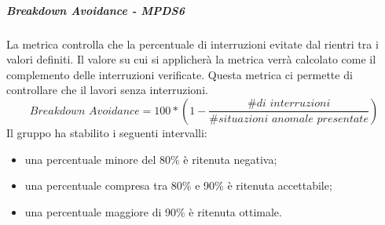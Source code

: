 \documentclass[PianoDiQualifica.tex]{subfiles}
\begin{document}
				\hypertarget{breakdown}{\subparagraph{Breakdown Avoidance - MPDS6}}
				La metrica controlla che la percentuale di interruzioni evitate dal  rientri tra i valori definiti. Il valore su cui si applicherà la metrica verrà calcolato come il
				complemento delle interruzioni verificate. Questa metrica ci permette di controllare che il  lavori senza interruzioni.
				\begin{equation}\textit{Breakdown Avoidance} = 100 * \left ( 1 - \frac{\textit{\# di interruzioni}}{\textit{\# situazioni anomale presentate}} \right ) \end{equation}
				Il gruppo ha stabilito i seguenti intervalli:
				\begin{itemize}
					\item una percentuale minore del 80\% è ritenuta negativa;
					\item una percentuale compresa tra 80\% e 90\% è ritenuta accettabile;
					\item una percentuale maggiore di 90\% è ritenuta ottimale.
				\end{itemize}
				
\end{document}
